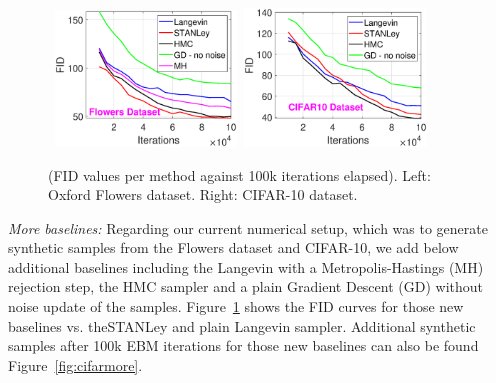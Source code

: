 \documentclass[10pt,twocolumn,letterpaper]{article}
\begin{document}
\begin{figure}[H]
\begin{center}
\mbox{\hspace{-0.2in}
        \includegraphics[width=1.9in]{figs/fid_flowersmore.eps} \hspace{-0.2in}
        \includegraphics[width=1.9in]{figs/fid_cifarmore.eps}
}
\end{center}\vspace{-0.1in}
	\caption{(FID values per method against 100k iterations elapsed). Left: Oxford Flowers dataset. Right: CIFAR-10 dataset.}
	\label{fig:fidallmore}
\end{figure}
\vspace{-0.05in}

\textit{More baselines:} Regarding our current numerical setup, which was to generate synthetic samples from the Flowers dataset and CIFAR-10, we add below additional baselines including the Langevin with a Metropolis-Hastings (MH) rejection step, the HMC sampler and a plain Gradient Descent (GD) without noise update of the samples.
Figure~\ref{fig:fidallmore} shows the FID curves for those new baselines vs. theSTANLey and plain Langevin sampler.
Additional synthetic samples after 100k EBM iterations for those new baselines can also be found  Figure~\ref{fig:cifarmore}.
\end{document}
